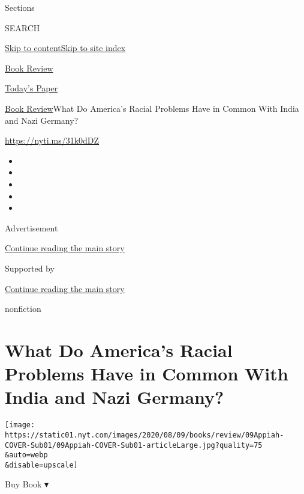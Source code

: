 Sections

SEARCH

\protect\hyperlink{site-content}{Skip to
content}\protect\hyperlink{site-index}{Skip to site index}

\href{https://www.nytimes.com/section/books/review}{Book Review}

\href{https://myaccount.nytimes.com/auth/login?response_type=cookie\&client_id=vi}{}

\href{https://www.nytimes.com/section/todayspaper}{Today's Paper}

\href{/section/books/review}{Book Review}\textbar{}What Do America's
Racial Problems Have in Common With India and Nazi Germany?

\url{https://nyti.ms/31k0dDZ}

\begin{itemize}
\item
\item
\item
\item
\item
\end{itemize}

Advertisement

\protect\hyperlink{after-top}{Continue reading the main story}

Supported by

\protect\hyperlink{after-sponsor}{Continue reading the main story}

nonfiction

\hypertarget{what-do-americas-racial-problems-have-in-common-with-india-and-nazi-germany}{%
\section{What Do America's Racial Problems Have in Common With India and
Nazi
Germany?}\label{what-do-americas-racial-problems-have-in-common-with-india-and-nazi-germany}}

\texttt{[image: https://static01.nyt.com/images/2020/08/09/books/review/09Appiah-COVER-Sub01/09Appiah-COVER-Sub01-articleLarge.jpg?quality=75\\\&auto=webp\\\&disable=upscale]}

Buy Book ▾

